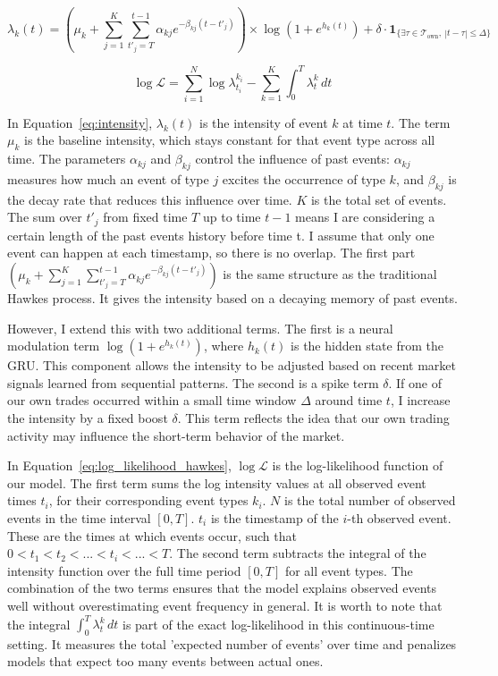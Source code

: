 \begin{equation}
    \lambda_k(t) = (\mu_k + \sum_{j=1}^{K} \sum_{t'_j=T}^{t-1} \alpha_{kj} e^{-\beta_{kj}(t - t'_j)}) \times \log(1+e^{h_k(t)}) + \delta \cdot \mathbf{1}_{\{\exists \tau \in \mathcal{T}_{\text{own}},\ |t - \tau| \leq \Delta \}}
    \label{eq:intensity}
\end{equation}

\begin{equation}
    \log \mathcal{L} = \sum_{i=1}^{N} \log \lambda_{t_i}^{k_i} - \sum_{k=1}^{K} \int_{0}^{T} \lambda_t^{k} \, dt
    \label{eq:log_likelihood_hawkes}
\end{equation}

In Equation~\ref{eq:intensity}, $\lambda_k(t)$ is the intensity of event $k$ at time $t$. The term $\mu_k$ is the baseline intensity, which stays constant for that event type across all time. The parameters $\alpha_{kj}$ and $\beta_{kj}$ control the influence of past events: $\alpha_{kj}$ measures how much an event of type $j$ excites the occurrence of type $k$, and $\beta_{kj}$ is the decay rate that reduces this influence over time. $K$ is the total set of events. The sum over $t'_j$ from fixed time $T$ up to time $t-1$ means I are considering a certain length of the past events history before time t. I assume that only one event can happen at each timestamp, so there is no overlap. The first part $(\mu_k + \sum_{j=1}^{K} \sum_{t'_j=T}^{t-1} \alpha_{kj} e^{-\beta_{kj}(t - t'_j)})$ is the same structure as the traditional Hawkes process. It gives the intensity based on a decaying memory of past events. 

However, I extend this with two additional terms. The first is a neural modulation term \( \log(1 + e^{h_k(t)}) \), where \( h_k(t) \) is the hidden state from the GRU. This component allows the intensity to be adjusted based on recent market signals learned from sequential patterns. The second is a spike term $\delta$. If one of our own trades occurred within a small time window \( \Delta \) around time \( t \), I increase the intensity by a fixed boost \( \delta \). This term reflects the idea that our own trading activity may influence the short-term behavior of the market.

In Equation~\ref{eq:log_likelihood_hawkes}, \( \log \mathcal{L} \) is the log-likelihood function of our model. The first term sums the log intensity values at all observed event times \( t_i \), for their corresponding event types \( k_i \). $N$ is the total number of observed events in the time interval \([0, T]\). $t_i$ is the timestamp of the $i$-th observed event. These are the times at which events occur, such that $0<t_1<t_2<...<t_i<...<T$.
The second term subtracts the integral of the intensity function over the full time period \([0, T]\) for all event types. The combination of the two terms ensures that the model explains observed events well without overestimating event frequency in general. It is worth to note that the integral $\int_{0}^{T} \lambda_t^{k} \, dt$ is part of the exact log-likelihood in this continuous-time setting. It measures the total 'expected number of events' over time and penalizes models that expect too many events between actual ones.



